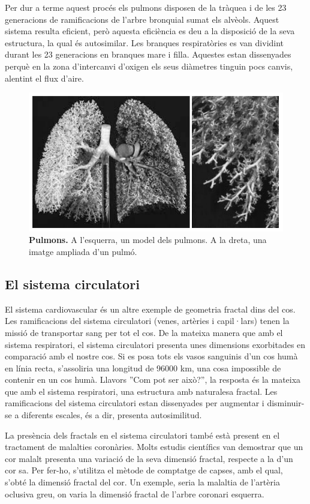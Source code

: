 \documentclass[12pt,a4paper]{report}
\begin{document}
Per dur a terme aquest procés els pulmons disposen de la tràquea i de les 23 generacions de ramificacions de l'arbre bronquial sumat els alvèols. Aquest sistema resulta eficient, però aquesta eficiència es deu a la disposició de la seva estructura, la qual és autosimilar.  Les branques respiratòries es van dividint durant les 23 generacions en branques mare i filla. Aquestes estan dissenyades perquè en la zona d'intercanvi d'oxigen els seus diàmetres tinguin pocs canvis, alentint el flux d'aire.   
\begin{figure}[!ht]
\centering
\includegraphics[scale=1]{img/img04_lung.pdf}
\caption{\textbf{Pulmons.} A l'esquerra, un model dels pulmons. A la dreta, una imatge ampliada d'un pulmó.}
\end{figure}
\subsection{El sistema circulatori}
El sistema cardiovascular és un altre exemple de geometria fractal dins del cos. Les ramificacions del sistema circulatori (venes, artèries i capil·lars) tenen la missió de transportar sang per tot el cos.  De la mateixa manera que amb el sistema respiratori, el sistema circulatori presenta unes dimensions exorbitades en comparació amb el nostre cos. Si es posa tots els vasos sanguinis d'un cos humà en línia recta, s'assoliria una longitud de 96000 km, una cosa impossible de contenir en un cos humà. Llavors ''Com pot ser això?'', la resposta és la mateixa que amb el sistema respiratori, una estructura amb naturalesa fractal. Les ramificacions del sistema circulatori estan dissenyades per augmentar i disminuir-se a diferents escales, és a dir, presenta autosimilitud.

La presència dels fractals en el sistema circulatori també està present en el tractament de malalties coronàries. Molts estudis científics van demostrar que un cor malalt presenta una variació de la seva dimensió fractal, respecte a la d'un cor sa. Per fer-ho, s'utilitza el mètode de comptatge de capses, amb el qual, s'obté la dimensió fractal del cor. Un exemple, seria la malaltia de l'artèria oclusiva greu, on varia la dimensió fractal de l'arbre coronari esquerra.
\end{document}
